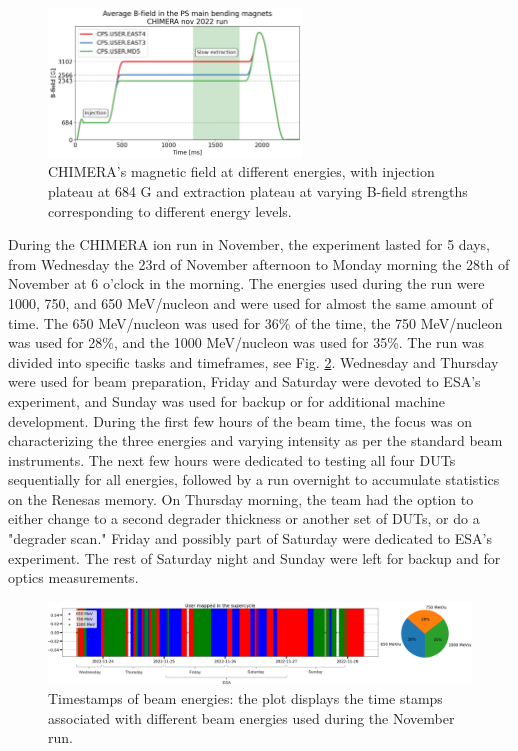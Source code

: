 \begin{figure}[!htb]
\centering
\includegraphics[width=0.6\textwidth]{images/PS_BEAM_ENERGY/average_b_field_chimera.png}
\caption{CHIMERA's magnetic field at different energies, with injection plateau at 684 G and extraction plateau at varying B-field strengths corresponding to different energy levels.}
\label{fig:bfield}
\end{figure}

During the CHIMERA ion run in November, the experiment lasted for 5 days, from Wednesday the 23rd of November afternoon to Monday morning the 28th of November at 6 o'clock in the morning. The energies used during the run were 1000, 750, and 650 MeV/nucleon and were used for almost the same amount of time. The 650 MeV/nucleon was used for 36\% of the time, the 750 MeV/nucleon was used for 28\%, and the 1000 MeV/nucleon was used for 35\%. The run was divided into specific tasks and timeframes, see Fig. \ref{fig:timestamp_energies}. Wednesday and Thursday were used for beam preparation, Friday and Saturday were devoted to ESA's experiment, and Sunday was used for backup or for additional machine development. During the first few hours of the beam time, the focus was on characterizing the three energies and varying intensity as per the standard beam instruments. The next few hours were dedicated to testing all four DUTs sequentially for all energies, followed by a run overnight to accumulate statistics on the Renesas memory. On Thursday morning, the team had the option to either change to a second degrader thickness or another set of DUTs, or do a "degrader scan." Friday and possibly part of Saturday were dedicated to ESA's experiment. The rest of Saturday night and Sunday were left for backup and for optics measurements.

\begin{figure}[!htb]
\centering
\includegraphics[width=1.0\textwidth]{images/PS_BEAM_ENERGY/user_mapping_timestamp.png}
\caption{Timestamps of beam energies: the plot displays the time stamps associated with different beam energies used during the November run.}
\label{fig:timestamp_energies}
\end{figure}


